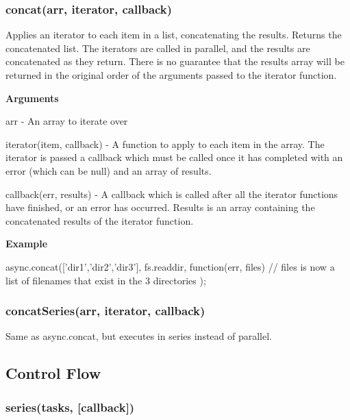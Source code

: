 \label{_concat}%
 \subsubsection*{concat(arr, iterator, callback)}

Applies an iterator to each item in a list, concatenating the results. Returns the concatenated list. The iterators are called in parallel, and the results are concatenated as they return. There is no guarantee that the results array will be returned in the original order of the arguments passed to the iterator function.

{\bfseries Arguments}


\begin{DoxyItemize}
\item arr -\/ An array to iterate over
\item iterator(item, callback) -\/ A function to apply to each item in the array. The iterator is passed a callback which must be called once it has completed with an error (which can be null) and an array of results.
\item callback(err, results) -\/ A callback which is called after all the iterator functions have finished, or an error has occurred. Results is an array containing the concatenated results of the iterator function.
\end{DoxyItemize}

{\bfseries Example} \begin{DoxyVerb}async.concat(['dir1','dir2','dir3'], fs.readdir, function(err, files){
    // files is now a list of filenames that exist in the 3 directories
});
\end{DoxyVerb}






\label{_concatSeries}%
 \subsubsection*{concat\+Series(arr, iterator, callback)}

Same as async.\+concat, but executes in series instead of parallel.

\subsection*{Control Flow}

\label{_series}%
 \subsubsection*{series(tasks, \mbox{[}callback\mbox{]})}

